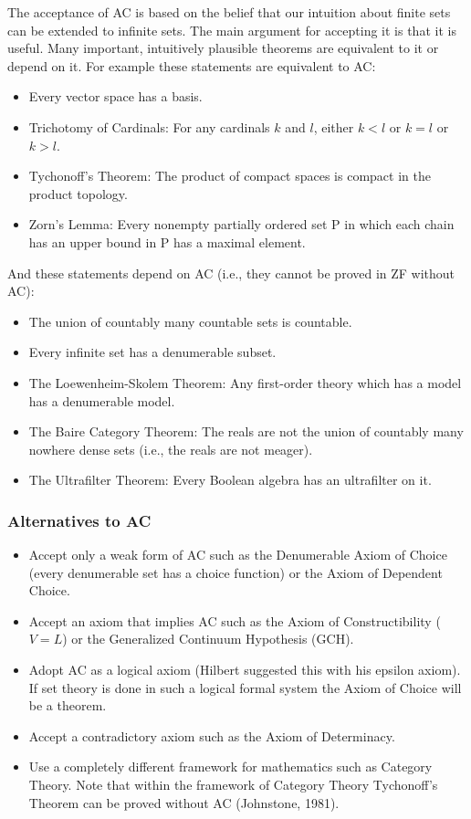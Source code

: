The acceptance of AC is based on the belief that our intuition about
finite sets can be extended to infinite sets.  The main argument for
accepting it is that it is useful.  Many important, intuitively
plausible theorems are equivalent to it or depend on it.  For example
these statements are equivalent to AC:
\begin{itemize}
  \item Every vector space has a basis.
  \item Trichotomy of Cardinals: For any cardinals $k$ and $l$, either
  $k<l$ or $k=l$ or $k>l$.
  \item Tychonoff's Theorem: The product of compact spaces is compact in
  the product topology.
  \item Zorn's Lemma: Every nonempty partially ordered set P in which
  each chain has an upper bound in P has a maximal element.
\end{itemize}

And these statements depend on AC (i.e., they cannot be proved in ZF
without AC):

\begin{itemize}
  \item The union of countably many countable sets is countable.
  \item Every infinite set has a denumerable subset.
  \item The Loewenheim-Skolem Theorem: Any first-order theory which has
  a model has a denumerable model.
  \item The Baire Category Theorem: The reals are not the union of
  countably many nowhere dense sets (i.e., the reals are not meager).
  \item The Ultrafilter Theorem: Every Boolean algebra has an
  ultrafilter on it.
\end{itemize}

\subsubsection{Alternatives to AC}

\begin{itemize}
  \item Accept only a weak form of AC such as the Denumerable Axiom of
  Choice (every denumerable set has a choice function) or the Axiom of
  Dependent Choice.
  \item Accept an axiom that implies AC such as the Axiom of
  Constructibility ($V=L$) or the Generalized Continuum Hypothesis
  (GCH).
  \item Adopt AC as a logical axiom (Hilbert suggested this with his
  epsilon axiom).  If set theory is done in such a logical formal system
  the Axiom of Choice will be a theorem.
  \item Accept a contradictory axiom such as the Axiom of Determinacy.
  \item Use a completely different framework for mathematics such as
  Category Theory.  Note that within the framework of Category Theory
  Tychonoff's Theorem can be proved without AC (Johnstone, 1981).
\end{itemize}

